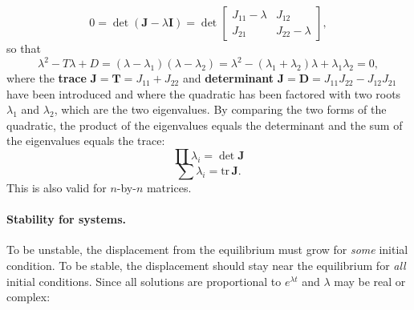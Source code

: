 \begin{equation}
\boxed{0 = \det(\boldsymbol{J} - \lambda\boldsymbol{I}) = \det\begin{bmatrix} J_{11} - \lambda & J_{12} \\ J_{21} & J_{22} - \lambda \end{bmatrix},}
\label{eq:14.8.15}
\end{equation}
so that
\begin{equation}
\boxed{\lambda^2 - T\lambda + D = (\lambda - \lambda_1)(\lambda - \lambda_2) = \lambda^2 - (\lambda_1 + \lambda_2)\lambda + \lambda_1\lambda_2 = 0,}
\label{eq:14.8.16}
\end{equation}
where the \textbf{trace} $\boldsymbol{J} = \boldsymbol{T} = J_{11} + J_{22}$ and \textbf{determinant} $\boldsymbol{J} = \boldsymbol{D} = J_{11}J_{22} - J_{12}J_{21}$ have been introduced and where the quadratic has been factored with two roots $\lambda_1$ and $\lambda_2$, which are the two eigenvalues. By comparing the two forms of the quadratic, the product of the eigenvalues equals the determinant and the sum of the eigenvalues equals the trace:
\begin{equation}
\boxed{\prod\lambda_i = \det\boldsymbol{J}}
\label{eq:14.8.17}
\end{equation}
\begin{equation}
\boxed{\sum\lambda_i = \text{tr}\,\boldsymbol{J}.}
\label{eq:14.8.18}
\end{equation}
This is also valid for $n$-by-$n$ matrices.

\paragraph{Stability for systems.}
To be unstable, the displacement from the equilibrium must grow for \emph{some} initial condition. To be stable, the displacement should stay near the equilibrium for \emph{all} initial conditions. Since all solutions are proportional to $e^{\lambda t}$ and $\lambda$ may be real or complex:
\begin{center}
\end{center}
\begin{center}
\end{center}


